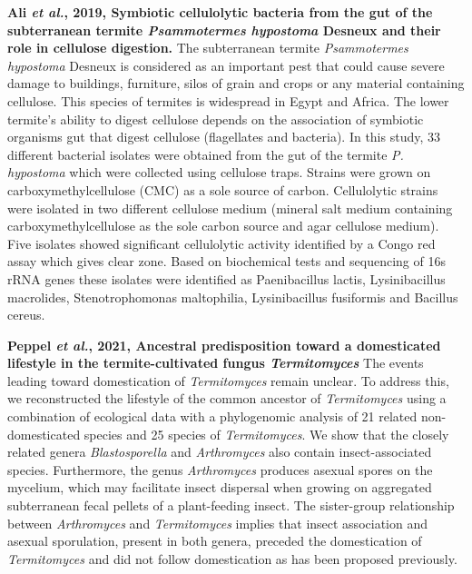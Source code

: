 \documentclass[11pt]{article}
\begin{document}
\begin{sloppypar}
\par
\textbf{Ali \textit{et al.}, 2019, Symbiotic cellulolytic bacteria from the gut of the subterranean termite \textit{Psammotermes hypostoma} Desneux and their role in cellulose digestion.} \newline
The subterranean termite \textit{Psammotermes hypostoma} Desneux is considered as an important pest that could cause severe damage to buildings, furniture, silos of grain and crops or any material containing cellulose. 
This species of termites is widespread in Egypt and Africa. 
The lower termite’s ability to digest cellulose depends on the association of symbiotic organisms gut that digest cellulose (flagellates and bacteria). 
In this study, 33 different bacterial isolates were obtained from the gut of the termite \textit{P. hypostoma} which were collected using cellulose traps. 
Strains were grown on carboxymethylcellulose (CMC) as a sole source of carbon. 
Cellulolytic strains were isolated in two different cellulose medium (mineral salt medium containing carboxymethylcellulose as the sole carbon source and agar cellulose medium). 
Five isolates showed significant cellulolytic activity identified by a Congo red assay which gives clear zone. 
Based on biochemical tests and sequencing of 16s rRNA genes these isolates were identified as Paenibacillus lactis, Lysinibacillus macrolides, Stenotrophomonas maltophilia, Lysinibacillus fusiformis and Bacillus cereus.
\par
\textbf{Peppel \textit{et al.}, 2021, Ancestral predisposition toward a domesticated lifestyle in the termite-cultivated fungus \textit{Termitomyces}} \newline
The events leading toward domestication of \textit{Termitomyces} remain unclear. 
To address this, we reconstructed the lifestyle of the common ancestor of \textit{Termitomyces} using a combination of ecological data with a phylogenomic analysis of 21 related non-domesticated species and 25 species of \textit{Termitomyces}. 
We show that the closely related genera \textit{Blastosporella} and \textit{Arthromyces} also contain insect-associated species. 
Furthermore, the genus \textit{Arthromyces} produces asexual spores on the mycelium, which may facilitate insect dispersal when growing on aggregated subterranean fecal pellets of a plant-feeding insect. 
The sister-group relationship between \textit{Arthromyces} and \textit{Termitomyces} implies that insect association and asexual sporulation, present in both genera, preceded the domestication of \textit{Termitomyces} and did not follow domestication as has been proposed previously. 

\end{sloppypar}
\end{document}
